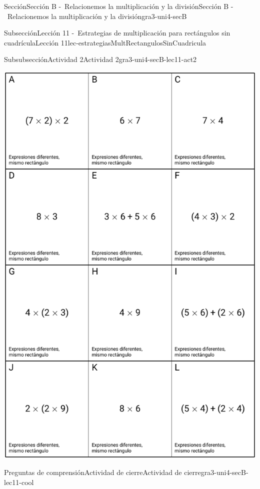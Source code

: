 \begin{sectionptx}{Sección}{Sección B -~Relacionemos la multiplicación y la división}{}{Sección B -~Relacionemos la multiplicación y la división}{}{}{gra3-uni4-secB}
\begin{subsectionptx}{Subsección}{Lección 11 -~Estrategias de multiplicación para rectángulos sin cuadrícula}{}{Lección 11}{}{}{lec-estrategiasMultRectangulosSinCuadricula}
\begin{subsubsectionptx}{Subsubsección}{Actividad 2}{}{Actividad 2}{}{}{gra3-uni4-secB-lec11-act2}
\begin{cutoutpage}
\begin{image}{0}{1}{0}{}
\includegraphics[max width=\linewidth, center]{external/blm/tikz-source/clasificacionTarjetas-expresionesDiferentesMismoRect-tarjetas.pdf}
\end{image}
\end{cutoutpage}
\end{subsubsectionptx}
%
%
\typeout{************************************************}
\typeout{************************************************}
%
\begin{reading-questions-subsubsection}{Preguntas de comprensión}{Actividad de cierre}{}{Actividad de cierre}{}{}{gra3-uni4-secB-lec11-cool}
%
\end{reading-questions-subsubsection}
\end{subsectionptx}

\end{sectionptx}
